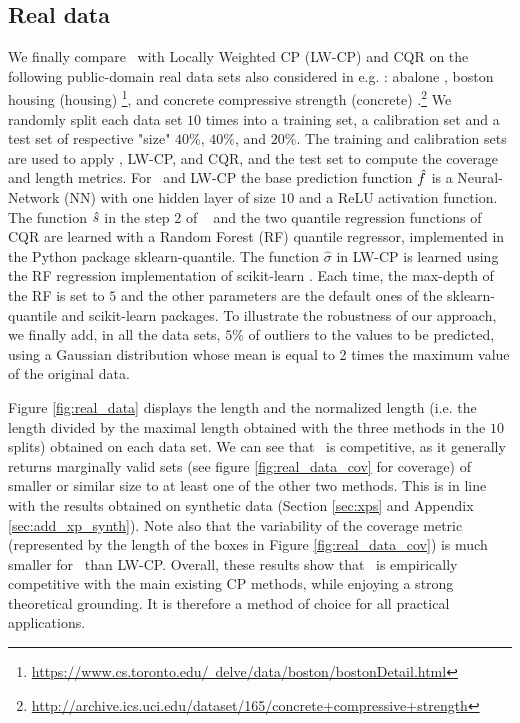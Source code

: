 \subsection{Real data}
\label{app:real-data}
%
We finally compare \methodAD~with Locally Weighted CP (LW-CP) and CQR on the following public-domain real data sets also considered in e.g. \citep{romano2019conformalized}: abalone \citep{abalone_1}, boston housing (housing) \citep{harrison1978hedonic}\footnote{\href{https://www.cs.toronto.edu/~delve/data/boston/bostonDetail.html}{https://www.cs.toronto.edu/~delve/data/boston/bostonDetail.html}}, and concrete
compressive strength (concrete) \citep{yeh1998modeling}.\footnote{\href{http://archive.ics.uci.edu/dataset/165/concrete+compressive+strength}{http://archive.ics.uci.edu/dataset/165/concrete+compressive+strength}} We randomly split each data set $10$ times into a training set, a calibration set and a test set of respective "size" $40\%$, $40\%$, and $20\%$. The training and calibration sets are used to apply \methodAD, LW-CP, and CQR, and the test set to compute the coverage and length metrics. For \methodAD~and LW-CP the base prediction function $\hat{f}$ is a Neural-Network (NN) with one hidden layer of size $10$ and a ReLU activation function. The function $\hat{s}$ in the step 2 of \methodAD~ and the two quantile regression functions of CQR are learned with a Random Forest (RF) quantile regressor, implemented in the Python package sklearn-quantile. The function $\hat{\sigma}$ in LW-CP is learned using the RF regression implementation of scikit-learn \citep{scikit-learn}. Each time, the max-depth of the RF is set to $5$ and the other parameters are the default ones of the sklearn-quantile and scikit-learn packages. To illustrate the robustness of our approach, we finally add, in all the data sets, $5\%$ of outliers to the values to be predicted, using a Gaussian distribution whose mean is equal to 2 times the maximum value of the original data.

Figure \ref{fig:real_data} displays the length and the normalized length (i.e. the length divided by the maximal length obtained with the three methods in the $10$ splits) obtained on each data set. We can see that \methodAD~is competitive, as it generally returns marginally valid sets (see figure \ref{fig:real_data_cov} for coverage) of smaller or similar size to at least one of the other two methods. This is in line with the results obtained on synthetic data (Section \ref{sec:xps} and Appendix \ref{sec:add_xp_synth}). Note also that the variability of the coverage metric (represented by the length of the boxes in Figure \ref{fig:real_data_cov}) is much smaller for \methodAD~than LW-CP. Overall, these results show that \methodAD~is empirically competitive with the main existing CP methods, while enjoying a strong theoretical grounding. It is therefore a method of choice for all practical applications.

